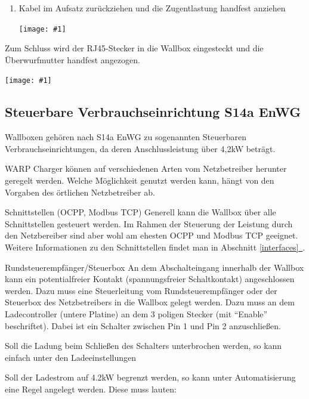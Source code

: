 \documentclass[a4paper,10pt]{article}
\newcommand{\gfx}[1]{\texttt{[image: \#1]}}
\newcommand*{\fullref}[1]{Abschnitt \hyperref[{#1}]{\ref*{#1}~\nameref*{#1}}}
\begin{document}
\begin{multicols*}{2}
\begin{enumerate}
        \item Kabel im Aufsatz zurückziehen und die Zugentlastung handfest anziehen

        \gfx{./img_warp2/resized/warp2_rj45_2_600}
    \end{enumerate}

    Zum Schluss wird der RJ45-Stecker in die Wallbox eingesteckt und die Überwurfmutter
    handfest angezogen.

    \gfx{./img_warp2/resized/warp2_ethernet4_600} %

    \subsection{Steuerbare Verbrauchseinrichtung S14a EnWG}
    Wallboxen gehören nach S14a EnWG zu sogenannten Steuerbaren
    Verbrauchseinrichtungen, da deren Anschlussleistung über 4,2kW beträgt.

    WARP Charger können auf verschiedenen Arten vom Netzbetreiber herunter
    geregelt werden. Welche Möglichkeit genutzt werden kann, hängt von den
    Vorgaben des örtlichen Netzbetreiber ab.

    \begin{description}
        \item{Schnittstellen (OCPP, Modbus TCP)} Generell kann die Wallbox über
        alle Schnittstellen gesteuert werden. Im Rahmen der Steuerung der
        Leistung durch den Netzbereiber sind aber wohl am ehesten OCPP und
        Modbus TCP geeignet. Weitere Informationen zu den Schnittstellen findet
        man in \fullref{interfaces}.
        \item{Rundsteuerempfänger/Steuerbox} An dem Abschalteingang innerhalb
        der Wallbox kann ein potentialfreier Kontakt (spannungsfreier Schaltkontakt)
        angeschlossen werden. Dazu muss eine Steuerleitung vom Rundsteuerempfänger
        oder der Steuerbox des Netzbetreibers in die Wallbox gelegt werden. Dazu
        muss an dem Ladecontroller (untere Platine) an dem 3 poligen Stecker
        (mit \enquote{Enable} beschriftet). Dabei ist ein Schalter zwischen Pin
        1 und Pin 2 anzuschließen.

        Soll die Ladung beim Schließen des Schalters unterbrochen werden, so
        kann einfach unter den Ladeeinstellungen

        Soll der Ladestrom auf 4.2kW begrenzt werden, so kann unter
        Automatisierung eine Regel angelegt werden. Diese muss lauten:


\end{description}
\end{multicols*}
\end{document}
